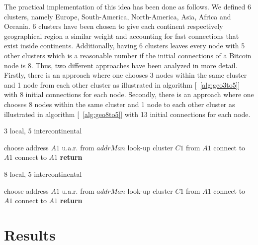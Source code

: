 \documentclass[a4paper, oneside]{discothesis}
\begin{document}
The practical implementation of this idea has been done as follows. We defined 6 clusters, namely Europe, South-America, North-America, Asia, Africa and Oceania. 6 clusters have been chosen to give each continent respectively geographical region a similar weight and accounting for fast connections that exist inside continents. Additionally, having 6 clusters leaves every node with 5 other clusters which is a reasonable number if the initial connections of a Bitcoin node is 8. Thus, two different approaches have been analyzed in more detail.
Firstly, there is an approach where one chooses 3 nodes within the same cluster and 1 node from each other cluster as illustrated in algorithm [~\ref{alg:geo3to5}] with 8 initial connections for each node.
Secondly, there is an approach where one chooses 8 nodes within the same cluster and 1 node to each other cluster as illustrated in algorithm [~\ref{alg:geo8to5}] with 13 initial connections for each node.

\begin{algorithm}
\caption{3 local, 5 intercontinental}\label{alg:geo3to5}
\begin{algorithmic}[1]
 
    \State choose address $A1$ u.a.r. from $addrMan$\;
    \State look-up cluster $C1$ from $A1$\;
        \State connect to $A1$
        \State connect to $A1$\;
    \EndIf
    \EndWhile
\State \textbf{return} 
\EndProcedure
\end{algorithmic}
\end{algorithm}

\begin{algorithm}
\caption{8 local, 5 intercontinental}\label{alg:geo8to5}
\begin{algorithmic}[1]
 
    \State choose address $A1$ u.a.r. from $addrMan$\;
    \State look-up cluster $C1$ from $A1$\;
        \State connect to $A1$
        \State connect to $A1$\;
    \EndIf
    \EndWhile
\State \textbf{return} 
\EndProcedure
\end{algorithmic}
\end{algorithm}

\chapter{Results}
\end{document}
